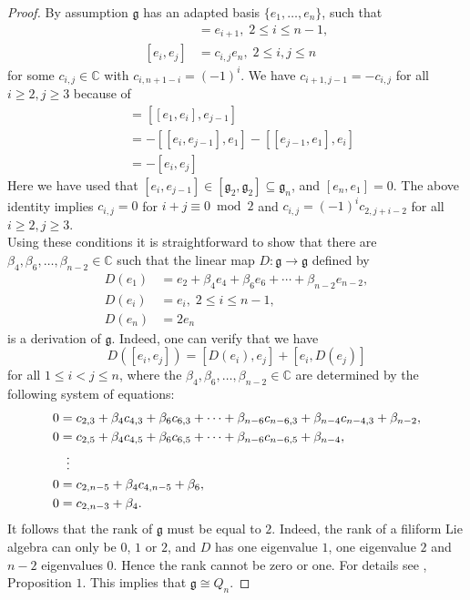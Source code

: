 \documentclass[12pt]{amsart}
\theoremstyle{definition}
\theoremstyle{remark}
\newcommand{\C}{\mathbb{C}}
\newcommand{\Lg}{\mathfrak{g}}
\newcommand{\be}{\beta}
\newcommand{\ra}{\rightarrow}
\begin{document}
\begin{proof}
By assumption $\Lg$ has an adapted basis $\{e_1,\ldots ,e_n\}$, such that
\begin{align*}
[e_1,e_i] & = e_{i+1},\; 2\le i\le n-1,\\
[e_i,e_j] & = c_{i,j}e_n,\; 2\le i,j \le n
\end{align*}
for some $c_{i,j}\in \C$ with $c_{i,n+1-i}=(-1)^i$. We have $c_{i+1,j-1}=-c_{i,j}$ for all $i\ge 2,j\ge 3$ because of
\begin{align*}
[e_{i+1},e_{j-1}] & = [[e_1,e_i],e_{j-1}] \\
                & = -[[e_i,e_{j-1}],e_1] -[[e_{j-1},e_1],e_i] \\
                & = - [e_i,e_j]
\end{align*}
Here we have used that $[e_i,e_{j-1}]\in [\Lg_2,\Lg_2]\subseteq \Lg_n$, and $[e_n,e_1]=0$. The above identity implies
$c_{i,j}=0$ for $i+j \equiv 0\bmod 2$ and $c_{i,j}=(-1)^ic_{2,j+i-2}$ for all $i\ge 2, j\ge 3$. \\[0.2cm]
Using these conditions it is straightforward to show that there are $\be_4,\be_6,\ldots, \be_{n-2}\in \C$ 
such that the linear map $D\colon \Lg\ra \Lg$ defined by
\begin{align*}
D(e_1) & = e_2+\be_4 e_4+\be_6e_6+\cdots +\be_{n-2}e_{n-2},\\
D(e_i) & = e_i, \; 2\le i\le n-1,\\
D(e_n) & = 2e_n 
\end{align*}
is a derivation of $\Lg$. Indeed, one can verify that we have
\[
D([e_i,e_j])=[D(e_i),e_j]+[e_i,D(e_j)]
\]
for all $1\le i<j\le n$, where the $\be_4,\be_6,\ldots, \be_{n-2}\in \C$ are determined by the following system of
equations:
\begin{align*}
0 & =c_{2,3} +\be_4c_{4,3}+\be_6 c_{6,3}+\cdots +\be_{n-6}c_{n-6,3}+ \be_{n-4}c_{n-4,3}+\be_{n-2},\\
0 & =c_{2,5} +\be_4c_{4,5}+\be_6 c_{6,5}+\cdots +\be_{n-6}c_{n-6,5}+\be_{n-4},\\
 &  \hspace*{0.2cm} \vdots \\
0 & =c_{2,n-5}+\be_4c_{4,n-5}+\be_6,\\
0 & = c_{2,n-3}+\be_4.  
\end{align*}
It follows that the rank of $\Lg$ must be equal to $2$. Indeed, the rank of a filiform Lie algebra can only be
$0$, $1$ or $2$,  and $D$ has one eigenvalue $1$, one eigenvalue $2$ and $n-2$ eigenvalues $0$.
Hence the rank cannot be zero or one. For details see \cite{GVE}, Proposition $1$.
This implies that $\Lg\cong Q_n$. 
\end{proof}  
\end{document}
